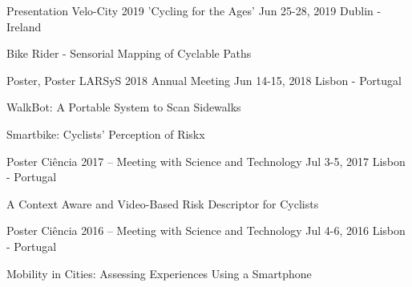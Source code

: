 \begin{cventries}

  \cventryshort
    {Presentation} %
    {Velo-City 2019 'Cycling for the Ages'} %
    {Jun 25-28, 2019} %
    {Dublin - Ireland} %
    {
      \begin{cvitems} %
        \item {Bike Rider - Sensorial Mapping of Cyclable Paths}
      \end{cvitems}
    }


  \cventryshort
    {Poster, Poster} %
    {LARSyS 2018 Annual Meeting} %
    {Jun 14-15, 2018} %
    {Lisbon - Portugal} %
    {
      \begin{cvitems} %
        \item {WalkBot: A Portable System to Scan Sidewalks}
        \item {Smartbike: Cyclists’ Perception of Riskx}
      \end{cvitems}
    }


  \cventryshort
    {Poster} %
    {Ciência 2017 – Meeting with Science and Technology} %
    {Jul 3-5, 2017} %
    {Lisbon - Portugal} %
    {
      \begin{cvitems} %
        \item {A Context Aware and Video-Based Risk Descriptor for Cyclists}
      \end{cvitems}
    }


  \cventryshort
    {Poster} %
    {Ciência 2016 – Meeting with Science and Technology} %
    {Jul 4-6, 2016} %
    {Lisbon - Portugal} %
    {
      \begin{cvitems} %
        \item {Mobility in Cities: Assessing Experiences Using a Smartphone}
      \end{cvitems}
    }

  

\end{cventries}
